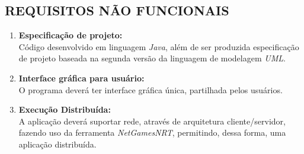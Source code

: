 \documentclass[12pt,a4paper,brazil,abntex2]{article}
\begin{document}
	\subsection{\normalsize REQUISITOS NÃO FUNCIONAIS}
		
		\begin{enumerate}

			\item {\bf Especificação de projeto:}\\Código desenvolvido em linguagem \textit{Java}, além de ser produzida especificação de projeto baseada na segunda versão da linguagem de modelagem \textit{UML}.

			\item {\bf Interface gráfica para usuário:}\\O programa deverá ter interface gráfica única, partilhada pelos usuários.
			
			\item {\bf Execução Distribuída:}\\ A aplicação deverá suportar rede, através de arquitetura cliente/servidor, fazendo uso da ferramenta \textit{NetGamesNRT}, permitindo, dessa forma, uma aplicação distribuída.
		\end{enumerate}
\end{document}
